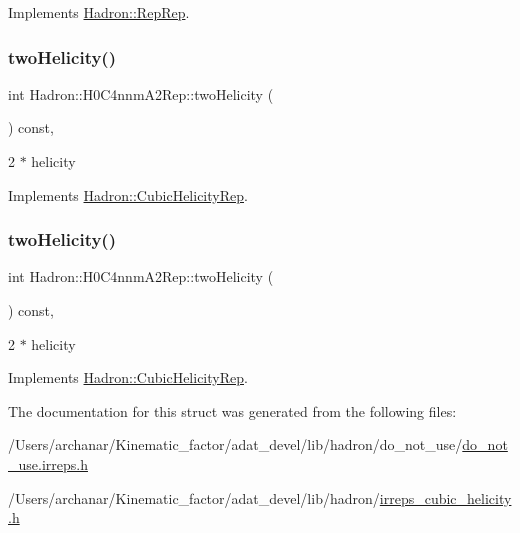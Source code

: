 Implements \mbox{\hyperlink{structHadron_1_1RepRep_ab3213025f6de249f7095892109575fde}{Hadron\+::\+Rep\+Rep}}.

\mbox{\label{structHadron_1_1H0C4nnmA2Rep_a397249fde56ef379e5651fa31203da8c}} 
\subsubsection{\texorpdfstring{twoHelicity()}{twoHelicity()}\hspace{0.1cm}{\footnotesize\ttfamily [1/2]}}
{\footnotesize\ttfamily int Hadron\+::\+H0\+C4nnm\+A2\+Rep\+::two\+Helicity (\begin{DoxyParamCaption}{ }\end{DoxyParamCaption}) const\hspace{0.3cm}{\ttfamily [inline]}, {\ttfamily [virtual]}}

2 $\ast$ helicity 

Implements \mbox{\hyperlink{structHadron_1_1CubicHelicityRep_af507aa56fc2747eacc8cb6c96db31ecc}{Hadron\+::\+Cubic\+Helicity\+Rep}}.

\mbox{\label{structHadron_1_1H0C4nnmA2Rep_a397249fde56ef379e5651fa31203da8c}} 
\subsubsection{\texorpdfstring{twoHelicity()}{twoHelicity()}\hspace{0.1cm}{\footnotesize\ttfamily [2/2]}}
{\footnotesize\ttfamily int Hadron\+::\+H0\+C4nnm\+A2\+Rep\+::two\+Helicity (\begin{DoxyParamCaption}{ }\end{DoxyParamCaption}) const\hspace{0.3cm}{\ttfamily [inline]}, {\ttfamily [virtual]}}

2 $\ast$ helicity 

Implements \mbox{\hyperlink{structHadron_1_1CubicHelicityRep_af507aa56fc2747eacc8cb6c96db31ecc}{Hadron\+::\+Cubic\+Helicity\+Rep}}.



The documentation for this struct was generated from the following files\+:\begin{DoxyCompactItemize}
\item 
/\+Users/archanar/\+Kinematic\+\_\+factor/adat\+\_\+devel/lib/hadron/do\+\_\+not\+\_\+use/\mbox{\hyperlink{do__not__use_8irreps_8h}{do\+\_\+not\+\_\+use.\+irreps.\+h}}\item 
/\+Users/archanar/\+Kinematic\+\_\+factor/adat\+\_\+devel/lib/hadron/\mbox{\hyperlink{lib_2hadron_2irreps__cubic__helicity_8h}{irreps\+\_\+cubic\+\_\+helicity.\+h}}\end{DoxyCompactItemize}
